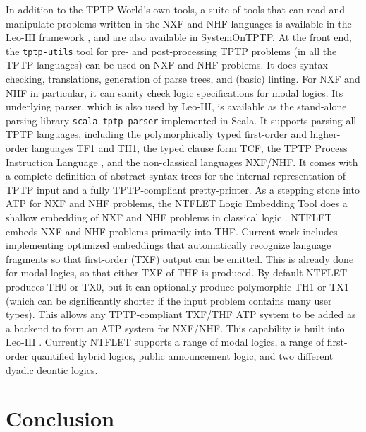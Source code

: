 \documentclass[runningheads]{llncs}
\begin{document}
In addition to the TPTP World's own tools, a suite of tools that can read and manipulate 
problems written in the NXF and NHF languages is available in the Leo-III framework \cite{SB21},
and are also available in SystemOnTPTP.
At the front end, the {\tt tptp-utils} tool \cite{Ste22-TU} for pre- and post-processing TPTP 
problems (in all the TPTP languages) can be used on NXF and NHF problems.
It does syntax checking, translations, generation of parse trees, and (basic) linting.
For NXF and NHF in particular, it can sanity check logic specifications for modal logics.
Its underlying parser, which is also used by Leo-III, is available as the stand-alone parsing 
library {\tt scala-tptp-parser} \cite{Ste21} implemented in Scala.
It supports parsing all TPTP languages, including the polymorphically typed first-order and 
higher-order languages TF1 and TH1, the typed clause form TCF, the TPTP Process Instruction 
Language \cite{NS14-PAAR}, and the non-classical languages NXF/NHF.
It comes with a complete definition of abstract syntax trees for the internal representation 
of TPTP input and a fully TPTP-compliant pretty-printer. 
As a stepping stone into ATP for NXF and NHF problems, the NTFLET Logic Embedding Tool 
\cite{Ste22-LE} does a shallow embedding of NXF and NHF problems in classical logic 
\cite{BP13,BR13,GSB17,GS18}.
NTFLET embeds NXF and NHF problems primarily into THF.
Current work includes implementing optimized embeddings that automatically recognize language 
fragments so that first-order (TXF) output can be emitted. 
This is already done for modal logics, so that either TXF of THF is produced. 
By default NTFLET produces TH0 or TX0, but it can optionally produce polymorphic TH1 or TX1 
(which can be significantly shorter if the input problem contains many user types).
This allows any TPTP-compliant TXF/THF ATP system to be added as a backend to form an 
ATP system for NXF/NHF.
This capability is built into Leo-III \cite{SB21,Ste22}.
Currently NTFLET supports a range of modal logics, a range of first-order quantified hybrid 
logics, public announcement logic, and two different dyadic deontic logics.

\section{Conclusion}
\label{Conclusion}



\end{document}
